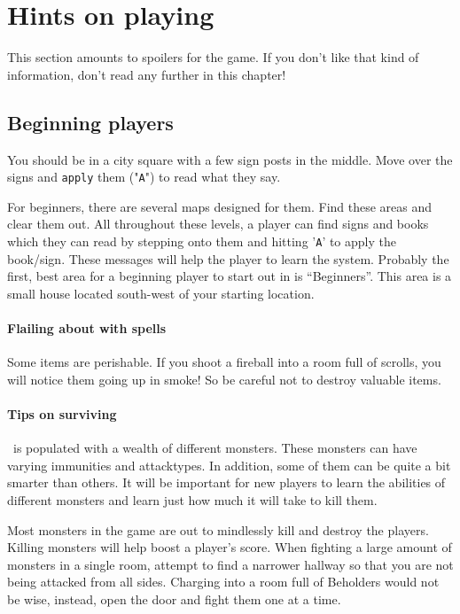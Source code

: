 
\chapter{Hints on playing \cf}

This section amounts to spoilers for the game. If you don't like 
that kind of information, don't read any further in this chapter!

\section{Beginning players}\label{sec:first}

You should be in a city square with a few sign posts in the middle. 
Move over the signs and {\tt apply} them ("{\tt A}") to read what they say.

For beginners, there are several maps designed for them. Find these areas
and clear them out. All throughout these levels, a player can find signs and
books which they can read by stepping onto them and hitting '{\tt A}' to apply the
book/sign. These messages will help the player to learn the system. 
Probably the first, best area for a beginning player to start out in
is ``Beginners''. This area is a small house located south-west of your
starting location.

\subsubsection{Flailing about with spells} 
Some items are perishable. If you shoot a
fireball into a room full of scrolls, you will notice them
going up in smoke! So be careful not to destroy valuable items. 

\subsubsection{Tips on surviving}
\cf\ is populated with a wealth of different monsters. These monsters
can have varying immunities and attacktypes. In addition, some of them can
be quite a bit smarter than others. It will be important for new players to
learn the abilities of different monsters and learn just how much it will
take to kill them. 
 
Most monsters in the game are out to mindlessly kill and destroy the
players. Killing monsters will help boost a player's score. 
When fighting a large amount of monsters in a single room, attempt to
find a narrower hallway so that you are not being attacked from all sides.
Charging into a room full of Beholders would not be wise,
instead, open the door and fight them one at a time.
 
